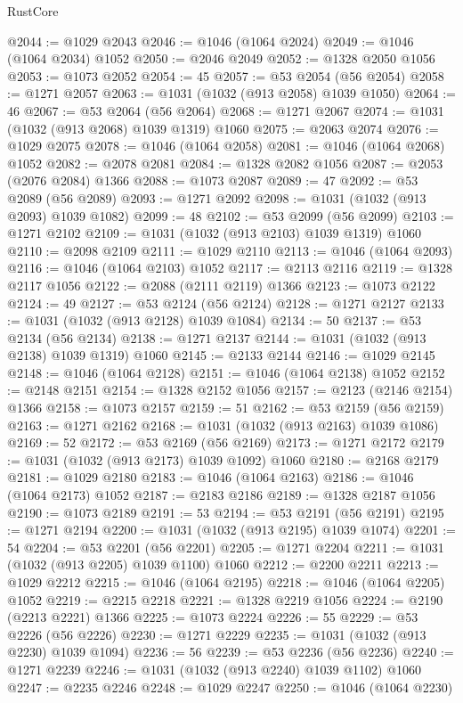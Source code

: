 \begin{lexlean}{RustCore}
\begin{coremodule}
@2044 := @1029 @2043
@2046 := @1046 (@1064 @2024)
@2049 := @1046 (@1064 @2034) @1052
@2050 := @2046 @2049
@2052 := @1328 @2050 @1056
@2053 := @1073 @2052
@2054 := 45
@2057 := @53 @2054 (@56 @2054)
@2058 := @1271 @2057
@2063 := @1031 (@1032 (@913 @2058) @1039 @1050)
@2064 := 46
@2067 := @53 @2064 (@56 @2064)
@2068 := @1271 @2067
@2074 := @1031 (@1032 (@913 @2068) @1039 @1319) @1060
@2075 := @2063 @2074
@2076 := @1029 @2075
@2078 := @1046 (@1064 @2058)
@2081 := @1046 (@1064 @2068) @1052
@2082 := @2078 @2081
@2084 := @1328 @2082 @1056
@2087 := @2053 (@2076 @2084) @1366
@2088 := @1073 @2087
@2089 := 47
@2092 := @53 @2089 (@56 @2089)
@2093 := @1271 @2092
@2098 := @1031 (@1032 (@913 @2093) @1039 @1082)
@2099 := 48
@2102 := @53 @2099 (@56 @2099)
@2103 := @1271 @2102
@2109 := @1031 (@1032 (@913 @2103) @1039 @1319) @1060
@2110 := @2098 @2109
@2111 := @1029 @2110
@2113 := @1046 (@1064 @2093)
@2116 := @1046 (@1064 @2103) @1052
@2117 := @2113 @2116
@2119 := @1328 @2117 @1056
@2122 := @2088 (@2111 @2119) @1366
@2123 := @1073 @2122
@2124 := 49
@2127 := @53 @2124 (@56 @2124)
@2128 := @1271 @2127
@2133 := @1031 (@1032 (@913 @2128) @1039 @1084)
@2134 := 50
@2137 := @53 @2134 (@56 @2134)
@2138 := @1271 @2137
@2144 := @1031 (@1032 (@913 @2138) @1039 @1319) @1060
@2145 := @2133 @2144
@2146 := @1029 @2145
@2148 := @1046 (@1064 @2128)
@2151 := @1046 (@1064 @2138) @1052
@2152 := @2148 @2151
@2154 := @1328 @2152 @1056
@2157 := @2123 (@2146 @2154) @1366
@2158 := @1073 @2157
@2159 := 51
@2162 := @53 @2159 (@56 @2159)
@2163 := @1271 @2162
@2168 := @1031 (@1032 (@913 @2163) @1039 @1086)
@2169 := 52
@2172 := @53 @2169 (@56 @2169)
@2173 := @1271 @2172
@2179 := @1031 (@1032 (@913 @2173) @1039 @1092) @1060
@2180 := @2168 @2179
@2181 := @1029 @2180
@2183 := @1046 (@1064 @2163)
@2186 := @1046 (@1064 @2173) @1052
@2187 := @2183 @2186
@2189 := @1328 @2187 @1056
@2190 := @1073 @2189
@2191 := 53
@2194 := @53 @2191 (@56 @2191)
@2195 := @1271 @2194
@2200 := @1031 (@1032 (@913 @2195) @1039 @1074)
@2201 := 54
@2204 := @53 @2201 (@56 @2201)
@2205 := @1271 @2204
@2211 := @1031 (@1032 (@913 @2205) @1039 @1100) @1060
@2212 := @2200 @2211
@2213 := @1029 @2212
@2215 := @1046 (@1064 @2195)
@2218 := @1046 (@1064 @2205) @1052
@2219 := @2215 @2218
@2221 := @1328 @2219 @1056
@2224 := @2190 (@2213 @2221) @1366
@2225 := @1073 @2224
@2226 := 55
@2229 := @53 @2226 (@56 @2226)
@2230 := @1271 @2229
@2235 := @1031 (@1032 (@913 @2230) @1039 @1094)
@2236 := 56
@2239 := @53 @2236 (@56 @2236)
@2240 := @1271 @2239
@2246 := @1031 (@1032 (@913 @2240) @1039 @1102) @1060
@2247 := @2235 @2246
@2248 := @1029 @2247
@2250 := @1046 (@1064 @2230)

\end{coremodule}
\end{lexlean}
